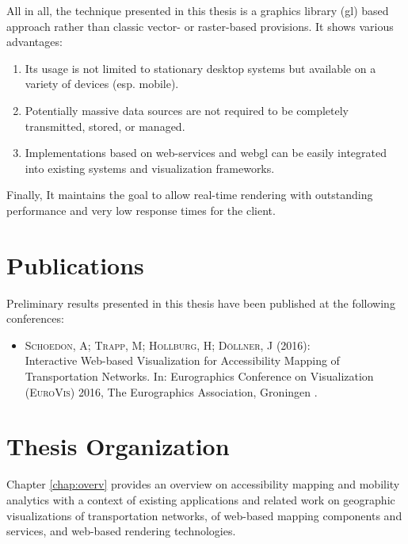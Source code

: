     All in all, the technique presented in this thesis is a graphics library
    (\acrshort{gl}) based approach rather than classic vector- or raster-based
    provisions. It shows various advantages:\par

    \begin{enumerate}[\label=({A}1)]
      \item \label{enu:advnt:a1} Its usage is not limited to stationary desktop
        systems but available on a variety of devices (esp. mobile).
      \item \label{enu:advnt:a2} Potentially massive data sources are not
        required to be completely transmitted, stored, or managed.
      \item \label{enu:advnt:a3} Implementations based on web-services and
        \acrshort{webgl} can be easily integrated into existing systems and
        visualization frameworks.
    \end{enumerate}

    Finally, It maintains the goal to allow real-time rendering with outstanding
    performance and very low response times for the client.\par


  \section{Publications}
    \label{sec:intro:publc}

    Preliminary results presented in this thesis have been published at the
    following conferences:

    \begin{itemize}
      \item \textsc{Schoedon, A; Trapp, M; Hollburg, H; Döllner,
        J (2016)}:\\ Interactive Web-based Visualization for Accessibility
        Mapping of Transportation Networks. In: Eurographics Conference on
        Visualization (\textsc{EuroVis}) 2016, The Eurographics Association,
        Groningen \cite{STHD2016}.
    \end{itemize}

  \section{Thesis Organization}
    \label{sec:intro:organ}
    Chapter \ref{chap:overv} provides an overview on accessibility mapping and
    mobility analytics with a context of existing applications and related work
    on geographic visualizations of transportation networks, of web-based
    mapping components and services, and web-based rendering technologies.\par

